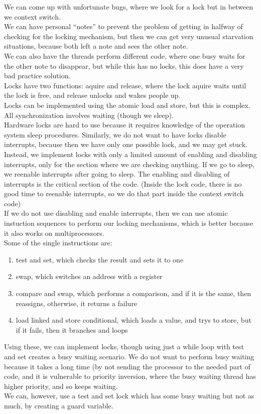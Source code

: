 \documentclass[paper=a4, fontsize=11pt]{scrartcl} %
\numberwithin{equation}{section} %
\numberwithin{figure}{section} %
\numberwithin{table}{section} %
\begin{document}
We can come up with unfortunate bugs, where we look for a lock but in between we context switch. \\
We can have personal ``notes'' to prevent the problem of getting in halfway of checking for the locking mechanism, but then we can get very unusual starvation situations, because both left a note and sees the other note.\\
We can also have the threads perform different code, where one busy waits for the other note to disappear, but while this has no locks, this does have a very bad practice solution. \\
Locks have two functions: aquire and release, where the lock aquire waits until the lock is free, and release unlocks and wakes people up. \\
Locks can be implemented using the atomic load and store, but this is complex. All synchronization involves waiting (though we sleep). \\
Hardware locks are hard to use because it requires knowledge of the operation system sleep procedures. Similarly, we do not want to have locks disable interrupts, because then we have only one possible lock, and we may get stuck.\\
Instead, we implement locks with only a limited amount of enabling and disabling interrupts, only for the section where we are checking anything. If we go to sleep, we reenable interrupts after going to sleep. The enabling and disabling of interrupts is the critical section of the code. (Inside the lock code, there is no good time to reenable interrupts, so we do that part inside the context switch code)\\
If we do not use disabling and enable interrupts, then we can use atomic instuction sequences to perform our locking mechanisms, which is better because it also works on multiprocessors. \\
Some of the single instructions are:
\begin{enumerate}
	\item test and set, which checks the result and sets it to one
    \item swap, which switches an address with a register
    \item compare and swap, which performs a comparison, and if it is the same, then reassigns, otherwise, it returns a failure
    \item load linked and store conditional, which loads a value, and trys to store, but if it fails, then it branches and loops
\end{enumerate}
Using these, we can implement locks, though using just a while loop with test and set creates a busy waiting scenario. We do not want to perform busy waiting because it takes a long time (by not sending the processor to the needed part of code, and it is vulnerable to priority inversion, where the busy waiting thread has higher priority, and so keeps waiting.\\
We can, however, use a test and set lock which has some busy waiting but not as much, by creating a guard variable. \\
\end{document}
